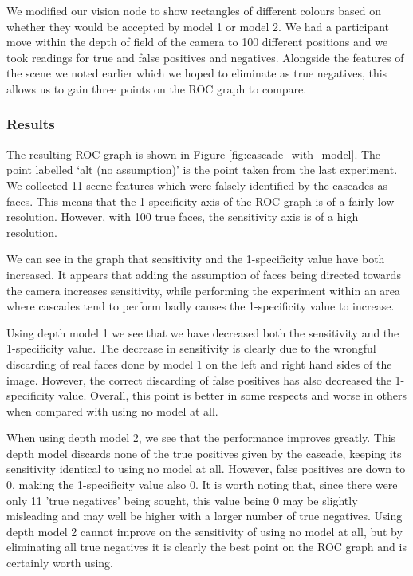 \documentclass[conference]{IEEEtran}
\begin{document}
We modified our vision node to show rectangles of different colours based on whether they would be accepted by model 1 or model 2. We had a participant move within the depth of field of the camera to 100 different positions and we took readings for true and false positives and negatives. Alongside the features of the scene we noted earlier which we hoped to eliminate as true negatives, this allows us to gain three points on the ROC graph to compare.
\subsubsection{Results}
The resulting ROC graph is shown in Figure \ref{fig:cascade_with_model}. The point labelled `alt (no assumption)' is the point taken from the last experiment. We collected 11 scene features which were falsely identified by the cascades as faces. This means that the 1-specificity axis of the ROC graph is of a fairly low resolution. However, with 100 true faces, the sensitivity axis is of a high resolution.

We can see in the graph that sensitivity and the 1-specificity value have both increased. It appears that adding the assumption of faces being directed towards the camera increases sensitivity, while performing the experiment within an area where cascades tend to perform badly causes the 1-specificity value to increase.

Using depth model 1 we see that we have decreased both the sensitivity and the 1-specificity value. The decrease in sensitivity is clearly due to the wrongful discarding of real faces done by model 1 on the left and right hand sides of the image. However, the correct discarding of false positives has also decreased the 1-specificity value. Overall, this point is better in some respects and worse in others when compared with using no model at all.

When using depth model 2, we see that the performance improves greatly. This depth model discards none of the true positives given by the cascade, keeping its sensitivity identical to using no model at all. However, false positives are down to 0, making the 1-specificity value also 0. It is worth noting that, since there were only 11 'true negatives' being sought, this value being 0 may be slightly misleading and may well be higher with a larger number of true negatives. Using depth model 2 cannot improve on the sensitivity of using no model at all, but by eliminating all true negatives it is clearly the best point on the ROC graph and is certainly worth using.
\end{document}

